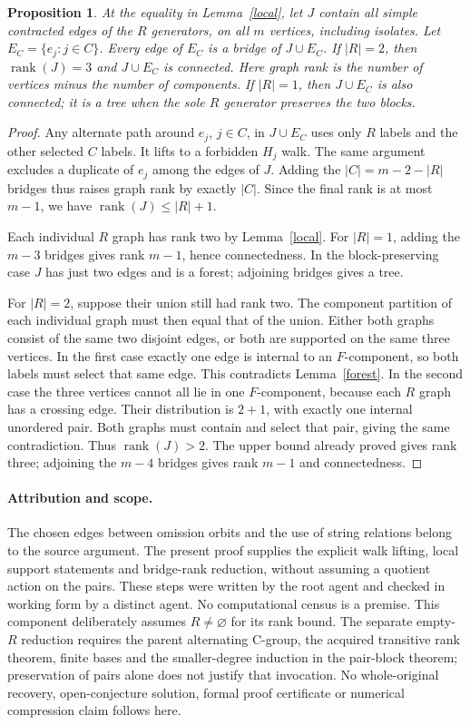 \documentclass[11pt,a4paper]{article}
\newtheorem{proposition}[lemma]{Proposition}
\begin{document}
\begin{proposition}\label{bridges}
At the equality in Lemma~\ref{local}, let $J$ contain all simple
contracted edges of the $R$ generators, on all $m$ vertices,
including isolates. Let $E_C=\{e_j:j\in C\}$.
Every edge of $E_C$ is a bridge of $J\cup E_C$.
If $|R|=2$, then $\operatorname{rank}(J)=3$ and $J\cup E_C$
is connected. Here graph rank is the number of vertices minus
the number of components.
If $|R|=1$, then $J\cup E_C$ is also connected; it is a tree
when the sole $R$ generator preserves the two blocks.
\end{proposition}
\begin{proof}
Any alternate path around $e_j$, $j\in C$, in $J\cup E_C$
uses only $R$ labels and the other selected $C$ labels. It lifts
to a forbidden $H_j$ walk. The same argument excludes a duplicate
of $e_j$ among the edges of $J$. Adding the $|C|=m-2-|R|$
bridges thus raises graph rank by exactly $|C|$. Since the final
rank is at most $m-1$, we have
$\operatorname{rank}(J)\le |R|+1$.

Each individual $R$ graph has rank two by Lemma~\ref{local}.
For $|R|=1$, adding the $m-3$ bridges gives rank $m-1$, hence
connectedness. In the block-preserving case $J$ has just two
edges and is a forest; adjoining bridges gives a tree.

For $|R|=2$, suppose their union still had rank two. The component
partition of each individual graph must then equal that of the
union. Either both graphs consist of the same two disjoint edges,
or both are supported on the same three vertices. In the first
case exactly one edge is internal to an $F$-component, so both
labels must select that same edge. This contradicts
Lemma~\ref{forest}. In the second case the three vertices cannot
all lie in one $F$-component, because each $R$ graph has a crossing
edge. Their distribution is $2+1$, with exactly one internal
unordered pair. Both graphs must contain and select that pair,
giving the same contradiction. Thus $\operatorname{rank}(J)>2$.
The upper bound already proved gives rank three; adjoining the
$m-4$ bridges gives rank $m-1$ and connectedness.
\end{proof}

\paragraph{Attribution and scope.}
The chosen edges between omission orbits and the use of string
relations belong to the source argument. The present proof supplies
the explicit walk lifting, local support statements and bridge-rank
reduction, without assuming a quotient action on the pairs. These
steps were written by the root agent and checked in working form
by a distinct agent. No computational census is a premise.
This component deliberately assumes $R\ne\varnothing$ for its
rank bound. The separate empty-$R$ reduction requires the parent
alternating C-group, the acquired transitive rank theorem, finite
bases and the smaller-degree induction in the pair-block theorem;
preservation of pairs alone does not justify that invocation.
No whole-original recovery, open-conjecture solution, formal proof
certificate or numerical compression claim follows here.
\end{document}
